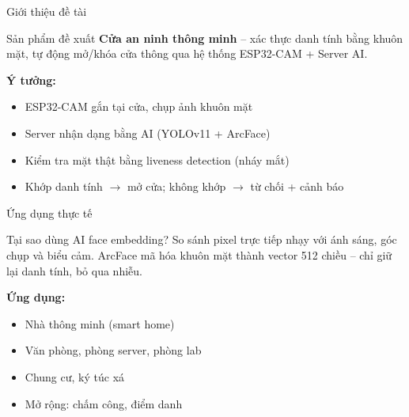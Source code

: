 \documentclass[aspectratio=169]{beamer}
\begin{document}
\begin{frame}{Giới thiệu đề tài}
  \begin{block}{Sản phẩm đề xuất}
    \textbf{Cửa an ninh thông minh} -- xác thực danh tính bằng khuôn mặt, tự động mở/khóa cửa thông qua hệ thống ESP32-CAM + Server AI.
  \end{block}

  \vspace{0.6em}
  \textbf{Ý tưởng:}
  \begin{itemize}
    \item ESP32-CAM gắn tại cửa, chụp ảnh khuôn mặt
    \item Server nhận dạng bằng AI (YOLOv11 + ArcFace)
    \item Kiểm tra mặt thật bằng liveness detection (nháy mắt)
    \item Khớp danh tính $\to$ mở cửa; không khớp $\to$ từ chối + cảnh báo
  \end{itemize}
\end{frame}

\begin{frame}{Ứng dụng thực tế}
  \begin{alertblock}{Tại sao dùng AI face embedding?}
    So sánh pixel trực tiếp nhạy với ánh sáng, góc chụp và biểu cảm.
    ArcFace mã hóa khuôn mặt thành vector 512 chiều -- chỉ giữ lại danh tính, bỏ qua nhiễu.
  \end{alertblock}

  \vspace{0.6em}
  \textbf{Ứng dụng:}
  \begin{itemize}
    \item Nhà thông minh (smart home)
    \item Văn phòng, phòng server, phòng lab
    \item Chung cư, ký túc xá
    \item Mở rộng: chấm công, điểm danh
  \end{itemize}
\end{frame}
\end{document}
